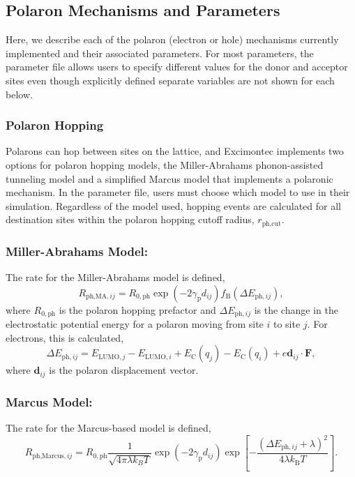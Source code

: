 \documentclass[%
 reprint,onecolumn,notitlepage,
superscriptaddress,longbibliography,
 amsmath,amssymb,
 aps,rmp,floatfix,
]{revtex4-1}
\begin{document}
\subsection{Polaron Mechanisms and Parameters}

Here, we describe each of the polaron (electron or hole) mechanisms currently implemented and their associated parameters.
For most parameters, the parameter file allows users to specify different values for the donor and acceptor sites even though explicitly defined separate variables are not shown for each below.

\subsubsection{Polaron Hopping}

Polarons can hop between sites on the lattice, and Excimontec implements two options for polaron hopping models, the Miller-Abrahams phonon-assisted tunneling model\cite{miller1960pr} and a simplified Marcus model \cite{marcus1956jcp} that implements a polaronic mechanism.
In the parameter file, users must choose which model to use in their simulation.
Regardless of the model used, hopping events are calculated for all destination sites within the polaron hopping cutoff radius, $r_{\text{ph,cut}}$.

\subsubsection*{\textbf{Miller-Abrahams Model:}}

The rate for the Miller-Abrahams model is defined,
$$R_{\text{ph,MA},ij} = R_{0,\text{ph}} \exp{\left(- 2 \gamma_{\text{p}} d_{ij} \right)} f_\text{B} \left( \Delta E_{\text{ph},ij}\right),$$
where $R_{0,\text{ph}}$ is the polaron hopping prefactor and $\Delta E_{\text{ph},ij}$ is the change in the electrostatic potential energy for a polaron moving from site $i$ to site $j$.
For electrons, this is calculated,
$$\Delta E_{\text{ph},ij} = E_{\text{LUMO},j} - E_{\text{LUMO},i} + E_\text{C}(q_j) - E_\text{C}(q_i) + e \mathbf{d}_{ij} \cdot \mathbf{F},$$
where $\mathbf{d}_{ij}$ is the polaron displacement vector.

\subsubsection*{\textbf{Marcus Model:}}

The rate for the Marcus-based model is defined,
$$R_{\text{ph,Marcus},ij} = R_{0,\text{ph}} \frac{1}{\sqrt{4\pi\lambda k_B T}}\exp{\left(- 2 \gamma_{\text{p}} d_{ij} \right)} \exp{\left[-\frac{(\Delta E_{\text{ph},ij}+\lambda)^2}{4\lambda k_\text{B} T} \right]}.$$
\end{document}
